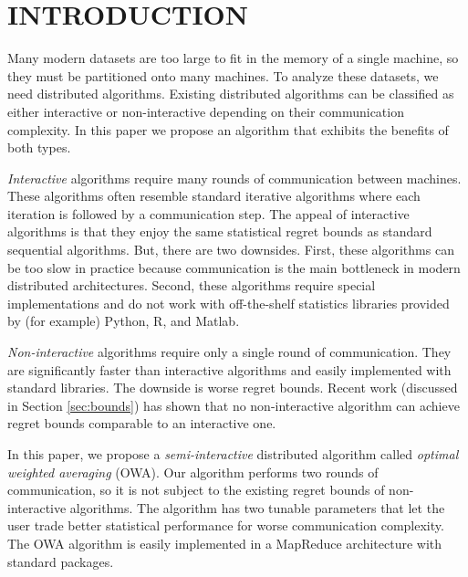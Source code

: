 \documentclass[twoside]{article}
\begin{document}



\section{INTRODUCTION}

Many modern datasets are too large to fit in the memory of a single machine,
so they must be partitioned onto many machines.
To analyze these datasets, we need distributed algorithms.
Existing distributed algorithms can be classified as either interactive or non-interactive depending on their communication complexity.
In this paper we propose an algorithm that exhibits the benefits of both types.

\emph{Interactive} algorithms require many rounds of communication between machines.
These algorithms often resemble standard iterative algorithms where each iteration is followed by a communication step.
The appeal of interactive algorithms is that they enjoy the same statistical regret bounds as standard sequential algorithms.
But, there are two downsides.
First, these algorithms can be too slow in practice because communication is the main bottleneck in modern distributed architectures.
Second, these algorithms require special implementations and do not work with off-the-shelf statistics libraries provided by (for example) Python, R, and Matlab.

\emph{Non-interactive} algorithms require only a single round of communication.
They are significantly faster than interactive algorithms and  easily implemented with standard libraries.
The downside is worse regret bounds.
Recent work (discussed in Section \ref{sec:bounds}) has shown that no non-interactive algorithm can achieve regret bounds comparable to an interactive one.

In this paper, we propose a \emph{semi-interactive} distributed algorithm called \emph{optimal weighted averaging} (OWA).
Our algorithm performs two rounds of communication,
so it is not subject to the existing regret bounds of non-interactive algorithms.
The algorithm has two tunable parameters that let the user trade better statistical performance for worse communication complexity.
The OWA algorithm is easily implemented in a MapReduce architecture with standard packages.
\end{document}
